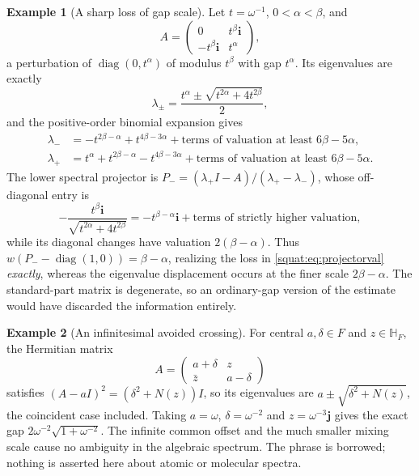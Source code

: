 \documentclass[11pt,letterpaper]{article}
\numberwithin{equation}{section}
\theoremstyle{definition}
\newtheorem{example}[example]{Example}
\theoremstyle{remark}
\newcommand{\HF}{\mathbb H_F}
\newcommand{\ii}{\mathbf i}
\newcommand{\jj}{\mathbf j}
\newcommand{\diag}{\operatorname{diag}}
\begin{document}
\begin{example}[A sharp loss of gap scale]\label{squat:ex:spectral}
Let $t=\omega^{-1}$, $0<\alpha<\beta$, and
\[
 A=\begin{pmatrix}0&t^\beta\ii\\-t^\beta\ii&t^\alpha\end{pmatrix},
\]
a perturbation of $\diag(0,t^\alpha)$ of modulus $t^\beta$ with gap $t^\alpha$. Its
eigenvalues are exactly
\begin{equation}\label{squat:eq:twoeigen}
 \lambda_\pm=\frac{t^\alpha\pm\sqrt{t^{2\alpha}+4t^{2\beta}}}{2},
\end{equation}
and the positive-order binomial expansion gives
\begin{align*}
 \lambda_-&=-t^{2\beta-\alpha}+t^{4\beta-3\alpha}
   +\text{terms of valuation at least }6\beta-5\alpha,\\
 \lambda_+&=t^\alpha+t^{2\beta-\alpha}-t^{4\beta-3\alpha}
   +\text{terms of valuation at least }6\beta-5\alpha .
\end{align*}
The lower spectral projector is $P_-=(\lambda_+I-A)/(\lambda_+-\lambda_-)$, whose
off-diagonal entry is
\[
 -\frac{t^\beta\ii}{\sqrt{t^{2\alpha}+4t^{2\beta}}}
 =-t^{\beta-\alpha}\ii+\text{terms of strictly higher valuation},
\]
while its diagonal changes have valuation $2(\beta-\alpha)$. Thus
$w(P_--\diag(1,0))=\beta-\alpha$, realizing the loss in
\cref{squat:eq:projectorval} \emph{exactly}, whereas the eigenvalue displacement occurs at
the finer scale $2\beta-\alpha$. The standard-part matrix is degenerate, so an
ordinary-gap version of the estimate would have discarded the information entirely.
\end{example}

\begin{example}[An infinitesimal avoided crossing]\label{squat:ex:crossing}
For central $a,\delta\in F$ and $z\in\HF$, the Hermitian matrix
\[
 A=\begin{pmatrix}a+\delta&z\\\bar z&a-\delta\end{pmatrix}
\]
satisfies $(A-aI)^2=(\delta^2+N(z))I$, so its eigenvalues are
$a\pm\sqrt{\delta^2+N(z)}$, the coincident case included. Taking $a=\omega$,
$\delta=\omega^{-2}$ and $z=\omega^{-3}\jj$ gives the exact gap
$2\omega^{-2}\sqrt{1+\omega^{-2}}$. The infinite common offset and the much smaller mixing
scale cause no ambiguity in the algebraic spectrum. The phrase is borrowed; nothing is
asserted here about atomic or molecular spectra.
\end{example}
\end{document}
